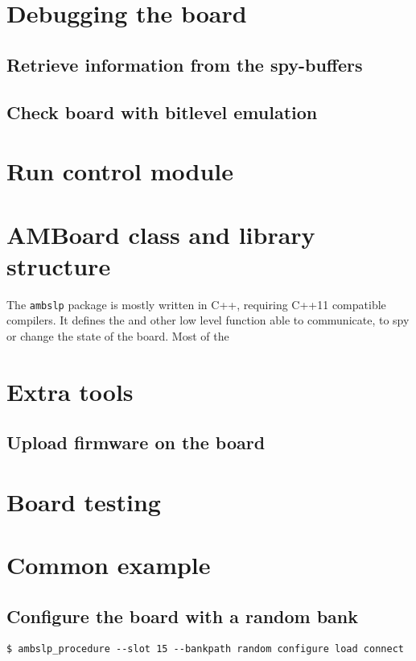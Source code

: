 \documentclass[UKenglish]{latex/atlasdoc}
\begin{document}
\section{Debugging the board}

\subsection{Retrieve information from the spy-buffers}


\subsection{Check board with bitlevel emulation}


\section{Run control module}



\section{AMBoard class and library structure}
\label{sec:library}

The \texttt{ambslp} package is mostly written in C++, requiring C++11 
compatible compilers. It defines the \textbf{\AMBoard}  and other low
level function able to communicate, to spy or change the state of the board.
Most of the 

\section{Extra tools}

\subsection{Upload firmware on the board}



\appendix
\section{Board testing}


\section{Common example}
\subsection{Configure the board with a random bank}

\begin{verbatim}
$ ambslp_procedure --slot 15 --bankpath random configure load connect
\end{verbatim}

\printindex
\end{document}
